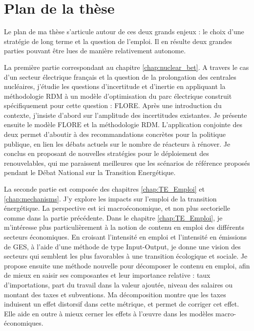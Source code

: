 \section{Plan de la thèse}

Le plan de ma thèse s'articule autour de ces deux grands enjeux : le choix d'une stratégie de long terme et la question de l'emploi.
Il en résulte deux grandes parties pouvant être lues de manière relativement autonome.

La première partie correspondant au chapitre \ref{chap:nuclear_bet}. A travers le cas d'un secteur électrique français et la question de la prolongation des centrales nucléaires, j'étudie les questions d'incertitude et d'inertie en appliquant la méthodologie RDM à un modèle d'optimisation du parc électrique construit spécifiquement pour cette question : FLORE. 
Après une introduction du contexte, j'insiste d'abord sur l'amplitude des incertitudes existantes. Je présente ensuite le modèle FLORE et la méthodologie RDM. 
L'application conjointe des deux permet d'aboutir à des recommandations concrètes pour la politique publique, en lien les débats actuels sur le nombre de réacteurs à rénover. Je conclus en proposant de nouvelles stratégies pour le déploiement des renouvelables, qui me paraissent meilleures que les scénarios de référence proposés pendant le Débat National sur la Transition Energétique.

La seconde partie est composée des chapitres \ref{chap:TE_Emploi} et \ref{chap:mechanisms}. J'y explore les impacts sur l'emploi de la transition énergétique. La perspective est ici macroéconomique, et non plus sectorielle comme dans la partie précédente.
Dans le chapitre \ref{chap:TE_Emploi}, je m'intéresse plus particulièrement à la notion de contenu en emploi des différents secteurs économiques. En croisant l'intensité en emploi et l'intensité en émissions de GES, à l'aide d'une méthode de type Input-Output, je donne une vision des secteurs qui semblent les plus favorables à une transition écologique et sociale. Je propose ensuite une méthode nouvelle pour décomposer le contenu en emploi, afin de mieux en saisir ses composantes et leur importance relative : taux d'importations, part du travail dans la valeur ajoutée, niveau des salaires ou montant des taxes et subventions. Ma décomposition montre que les taxes induisent un effet distorsif dans cette métrique, et permet de corriger cet effet. Elle aide en outre à mieux cerner les effets à l'\oe{}uvre dans les modèles macro-économiques.

